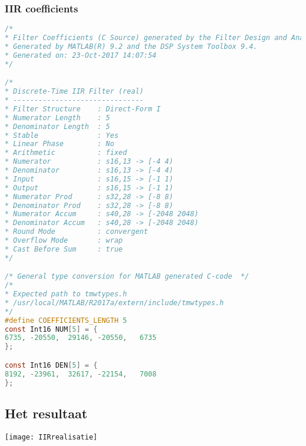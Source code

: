 \subsubsection{IIR coefficients}
\begin{lstlisting}[language=c]
/*
* Filter Coefficients (C Source) generated by the Filter Design and Analysis Tool
* Generated by MATLAB(R) 9.2 and the DSP System Toolbox 9.4.
* Generated on: 23-Oct-2017 14:07:54
*/

/*
* Discrete-Time IIR Filter (real)
* -------------------------------
* Filter Structure    : Direct-Form I
* Numerator Length    : 5
* Denominator Length  : 5
* Stable              : Yes
* Linear Phase        : No
* Arithmetic          : fixed
* Numerator           : s16,13 -> [-4 4)
* Denominator         : s16,13 -> [-4 4)
* Input               : s16,15 -> [-1 1)
* Output              : s16,15 -> [-1 1)
* Numerator Prod      : s32,28 -> [-8 8)
* Denominator Prod    : s32,28 -> [-8 8)
* Numerator Accum     : s40,28 -> [-2048 2048)
* Denominator Accum   : s40,28 -> [-2048 2048)
* Round Mode          : convergent
* Overflow Mode       : wrap
* Cast Before Sum     : true
*/

/* General type conversion for MATLAB generated C-code  */
/* 
* Expected path to tmwtypes.h 
* /usr/local/MATLAB/R2017a/extern/include/tmwtypes.h 
*/
#define COEFFICIENTS_LENGTH 5
const Int16 NUM[5] = {
6735, -20550,  29146, -20550,   6735
};

const Int16 DEN[5] = {
8192, -23961,  32617, -22154,   7008
};	   
\end{lstlisting}
\clearpage

\subsection{Het resultaat}	

    \texttt{[image: IIRrealisatie]}\par\vspace{1cm}
    
\clearpage